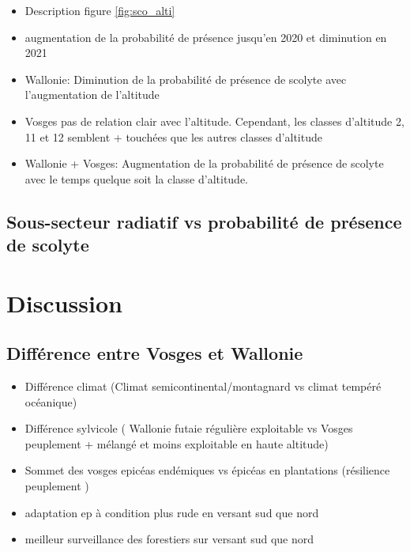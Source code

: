 \documentclass[3p,times]{elsarticle}
\begin{document}
\begin{itemize}
	\item Description figure \ref{fig:sco_alti} 
	\item augmentation de la probabilité de présence jusqu'en 2020 et diminution en 2021
	\item Wallonie: Diminution de la probabilité de présence de scolyte avec l'augmentation de l'altitude 
	\item Vosges pas de relation clair avec l'altitude. Cependant, les classes d'altitude 2, 11 et 12 semblent + touchées que les autres classes d'altitude
	
	\item Wallonie + Vosges: Augmentation de la probabilité de présence de scolyte avec le temps quelque soit la classe d'altitude.
\end{itemize}



\subsection{Sous-secteur radiatif vs probabilité de présence de scolyte}


	



\section{Discussion}

\subsection{Différence entre Vosges et Wallonie}
\begin{itemize}
	\item Différence climat (Climat semicontinental/montagnard vs climat tempéré océanique)
	\item Différence sylvicole ( Wallonie futaie régulière exploitable vs Vosges peuplement + mélangé et moins exploitable en haute altitude)
	\item Sommet des vosges epicéas endémiques vs épicéas en plantations (résilience peuplement )
	\item adaptation ep à condition plus rude en versant sud que nord 
	\item meilleur surveillance des forestiers sur versant sud que nord 
	
\end{itemize}
\end{document}
